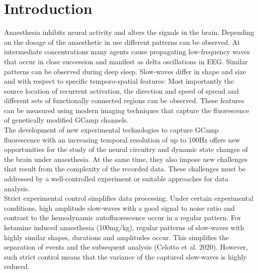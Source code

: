 
\chapter{Introduction} %

\label{Chapter1} %
\newcommand{\keyword}[1]{\textbf{#1}}
\newcommand{\tabhead}[1]{\textbf{#1}}
\newcommand{\code}[1]{\texttt{#1}}
\newcommand{\file}[1]{\texttt{\bfseries#1}}
\newcommand{\option}[1]{\texttt{\itshape#1}}
Anaesthesia inhibits neural activity and alters the signals in the brain. Depending on the dosage of the anaesthetic in use different patterns can be observed. At intermediate concentrations many agents cause propagating low-frequency waves that occur in close succession and manifest as delta oscillations in EEG. Similar patterns can be observed during deep sleep. Slow-waves differ in shape and size and with respect to specific temporo-spatial features: Most importantly the source location of recurrent activation, the direction and speed of spread and different sets of functionally connected regions can be observed. These features can be measured using modern imaging techniques that capture the fluorescence of genetically modified GCamp channels.\\
The development of new experimental technologies to capture GCamp fluorescence with an increasing temporal resolution of up to 100Hz offers new opportunities for the study of the neural circuitry and dynamic state changes of the brain under anaesthesia. At the same time, they also impose new challenges that result from the complexity of the recorded data. These challenges must be addressed by a well-controlled experiment or suitable approaches for data analysis.\\ 
Strict experimental control simplifies data processing. Under certain experimental conditions, high amplitude slow-waves with a good signal to noise ratio and contrast to the hemodynamic autofluorescence occur in a regular pattern. For ketamine induced anaesthesia (100mg/kg), regular patterns of slow-waves with highly similar shapes, durations and amplitudes occur. This simplifies the separation of events and the subsequent analysis (Celotto et al. 2020). However, such strict control means that the variance of the captured slow-waves is highly reduced.\\

